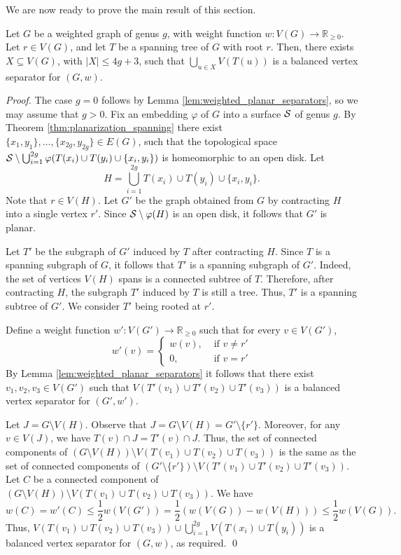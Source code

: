 \documentclass[envcountsect]{llncs}
\renewcommand{\phi}{\varphi}
\begin{document}
We are now ready to prove the main result of this section.

\begin{lemma}\label{lem:genus_separator_weighted}
Let $G$ be a weighted graph of genus $g$, with weight function $w:V(G)\to \mathbb{R}_{\geq 0}$.
Let $r\in V(G)$, and let $T$ be a spanning tree of $G$ with root $r$.
Then, there exists $X\subseteq V(G)$, with $|X|\leq 4g+3$, such that $\bigcup_{u\in X} V(T(u))$ is a balanced vertex separator for $(G,w)$.
\end{lemma}
\begin{proof}
The case $g=0$ follows by Lemma \ref{lem:weighted_planar_separators}, so we may assume that $g>0$.
Fix an embedding $\phi$ of $G$ into a surface ${\cal S}$ of genus $g$.
By Theorem \ref{thm:planarization_spanning} there exist $\{x_1,y_1\},\ldots,\{x_{2g},y_{2g}\}\in E(G)$, such that the topological space ${\cal S}\setminus \bigcup_{i=1}^{2g} \phi(T(x_i)\cup T(y_i)\cup \{x_i,y_i\})$ is homeomorphic to an open disk.
Let
\[
H = \bigcup_{i=1}^{2g} T(x_i)\cup T(y_i)\cup \{x_i,y_i\}.
\]
Note that $r\in V(H)$.
Let $G'$ be the graph obtained from $G$ by contracting $H$ into a single vertex $r'$.
Since ${\cal S}\setminus \phi(H)$ is an open disk, it follows that $G'$ is planar.

Let $T'$ be the subgraph of $G'$ induced by $T$ after contracting $H$.
Since $T$ is a spanning subgraph of $G$, it follows that $T'$ is a spanning subgraph of $G'$.
Indeed, the set of vertices $V(H)$ spans is a connected subtree of $T$.
Therefore, after contracting $H$, the subgraph $T'$ induced by $T$ is still a tree.
Thus, $T'$ is a spanning subtree of $G'$.
We consider $T'$ being rooted at $r'$.

Define a weight function $w':V(G')\to \mathbb{R}_{\geq 0}$ such that for every $v\in V(G')$,
\[
w'(v) = \left\{ \begin{array}{ll}
  w(v), & \mbox{ if } v\neq r'\\
  0, & \mbox{ if } v=r'
\end{array}
\right.
\]
By Lemma \ref{lem:weighted_planar_separators} it follows that there exist $v_1,v_2,v_3\in V(G')$ such that $V(T'(v_1)\cup T'(v_2)\cup T'(v_3))$ is a balanced vertex separator for $(G',w')$.

Let $J = G\setminus V(H)$.
Observe that $J = G\setminus V(H) = G' \setminus \{r'\}$.
Moreover, for any $v\in V(J)$, we have $T(v)\cap J = T'(v)\cap J$.
Thus, the set of connected components of $(G \setminus V(H)) \setminus V(T(v_1)\cup T(v_2)\cup T(v_3))$ is the same as the set of connected components of $(G' \setminus \{r'\}) \setminus V(T'(v_1)\cup T'(v_2)\cup T'(v_3))$.
Let $C$ be a connected component of $(G \setminus V(H)) \setminus V(T(v_1)\cup T(v_2)\cup T(v_3))$.
We have
\[
w(C) = w'(C) \leq \frac{1}{2} w(V(G')) = \frac{1}{2} (w(V(G)) - w(V(H))) \leq \frac{1}{2} w(V(G)).
\]
Thus, $V(T(v_1) \cup T(v_2)\cup T(v_3)) \cup \bigcup_{i=1}^{2g} V(T(x_i) \cup T(y_i))$ is a balanced vertex separator for $(G,w)$, as required.
\qed
\end{proof}
\end{document}

